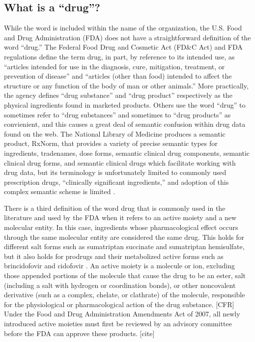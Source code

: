 \documentclass{bioinfo}
\begin{document}
\subsection{What is a ``drug''?}
While the word is included within the name of the organization, the U.S. Food and Drug Administration (FDA) does not have a straightforward definition of the word ``drug.'' The Federal Food Drug and Cosmetic Act (FD\&C Act) and FDA regulations define the term drug, in part, by reference to its intended use, as ``articles intended for use in the diagnosis, cure, mitigation, treatment, or prevention of disease” and “articles (other than food) intended to affect the structure or any function of the body of man or other animals.'' \citep{FDADrug}
More practically, the agency defines ``drug substance'' and ``drug product'' respectively as the physical ingredients found in marketed products. Others use the word ``drug'' to sometimes refer to ``drug substances'' and sometimes to ``drug products'' as convienient, and this causes a great deal of semantic confusion within drug data found on the web. The National Library of Medicine produces a semantic product, RxNorm, that provides a variety of precise semantic types for ingredients, tradenames, dose forms, semantic clinical drug components, semantic clinical drug forms, and semantic clinical drugs which facilitate working with drug data, but its terminology is unfortunately limited to commonly used prescription drugs, ``clinically significant ingredients,'' and adoption of this complex semantic scheme is limited \citep{RxNorm}.

There is a third definition of the word drug that is commonly used in the literature and used by the FDA when it refers to an active moiety and a new molecular entity. In this case, ingredients whose pharmacological effect occurs through the same molecular entity are considered the same drug. This holds for different salt forms such as sumatriptan succinate and sumatriptan hemisulfate, but it also holds for prodrugs and their metabolized active forms such as brincidofovir and cidofovir \citep{NME}. An active moiety is a molecule or ion, excluding those appended portions of the molecule that cause the drug to be an ester, salt (including a salt with hydrogen or coordination bonds), or other noncovalent derivative (such as a complex, chelate, or clathrate) of the molecule, responsible for the physiological or pharmacological action of the drug substance. [CFR] Under the Food and Drug Administration Amendments Act of 2007, all newly introduced active moieties must first be reviewed by an advisory committee before the FDA can approve these products. [cite]
\end{document}
